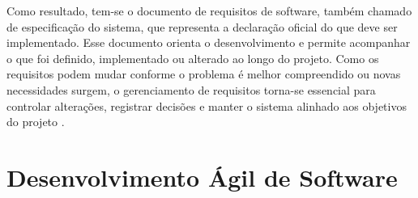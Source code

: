 Como resultado, tem-se o documento de requisitos de software, também chamado de especificação do sistema, que representa a declaração oficial do que deve ser implementado. Esse documento orienta o desenvolvimento e permite acompanhar o que foi definido, implementado ou alterado ao longo do projeto. Como os requisitos podem mudar conforme o problema é melhor compreendido ou novas necessidades surgem, o gerenciamento de requisitos torna-se essencial para controlar alterações, registrar decisões e manter o sistema alinhado aos objetivos do projeto \cite{sommerville2016,swebok2024}.

\section{Desenvolvimento Ágil de Software}

